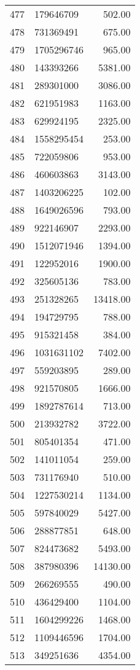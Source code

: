 \begin{table}[ht]
\begin{tabular}{rlr}
  477 & 179646709 & 502.00 \\ 
  478 & 731369491 & 675.00 \\ 
  479 & 1705296746 & 965.00 \\ 
  480 & 143393266 & 5381.00 \\ 
  481 & 289301000 & 3086.00 \\ 
  482 & 621951983 & 1163.00 \\ 
  483 & 629924195 & 2325.00 \\ 
  484 & 1558295454 & 253.00 \\ 
  485 & 722059806 & 953.00 \\ 
  486 & 460603863 & 3143.00 \\ 
  487 & 1403206225 & 102.00 \\ 
  488 & 1649026596 & 793.00 \\ 
  489 & 922146907 & 2293.00 \\ 
  490 & 1512071946 & 1394.00 \\ 
  491 & 122952016 & 1900.00 \\ 
  492 & 325605136 & 783.00 \\ 
  493 & 251328265 & 13418.00 \\ 
  494 & 194729795 & 788.00 \\ 
  495 & 915321458 & 384.00 \\ 
  496 & 1031631102 & 7402.00 \\ 
  497 & 559203895 & 289.00 \\ 
  498 & 921570805 & 1666.00 \\ 
  499 & 1892787614 & 713.00 \\ 
  500 & 213932782 & 3722.00 \\ 
  501 & 805401354 & 471.00 \\ 
  502 & 141011054 & 259.00 \\ 
  503 & 731176940 & 510.00 \\ 
  504 & 1227530214 & 1134.00 \\ 
  505 & 597840029 & 5427.00 \\ 
  506 & 288877851 & 648.00 \\ 
  507 & 824473682 & 5493.00 \\ 
  508 & 387980396 & 14130.00 \\ 
  509 & 266269555 & 490.00 \\ 
  510 & 436429400 & 1104.00 \\ 
  511 & 1604299226 & 1468.00 \\ 
  512 & 1109446596 & 1704.00 \\ 
  513 & 349251636 & 4354.00 \\ 

\end{tabular}
\end{table}
